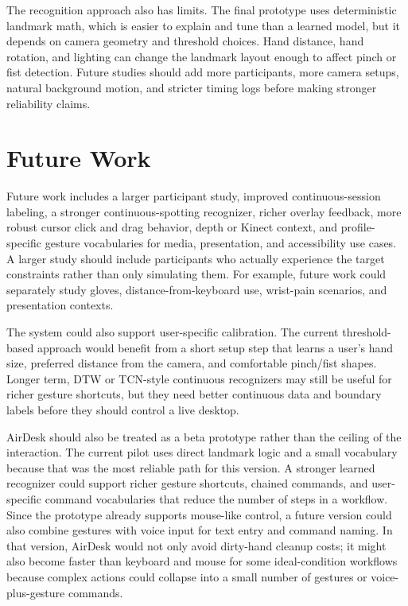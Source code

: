 \documentclass[manuscript]{acmart}
\begin{document}
The recognition approach also has limits. The final prototype uses deterministic landmark math, which is easier to explain and tune than a learned model, but it depends on camera geometry and threshold choices. Hand distance, hand rotation, and lighting can change the landmark layout enough to affect pinch or fist detection. Future studies should add more participants, more camera setups, natural background motion, and stricter timing logs before making stronger reliability claims.

\section{Future Work}

Future work includes a larger participant study, improved continuous-session labeling, a stronger continuous-spotting recognizer, richer overlay feedback, more robust cursor click and drag behavior, depth or Kinect context, and profile-specific gesture vocabularies for media, presentation, and accessibility use cases. A larger study should include participants who actually experience the target constraints rather than only simulating them. For example, future work could separately study gloves, distance-from-keyboard use, wrist-pain scenarios, and presentation contexts.

The system could also support user-specific calibration. The current threshold-based approach would benefit from a short setup step that learns a user's hand size, preferred distance from the camera, and comfortable pinch/fist shapes. Longer term, DTW or TCN-style continuous recognizers may still be useful for richer gesture shortcuts, but they need better continuous data and boundary labels before they should control a live desktop.

AirDesk should also be treated as a beta prototype rather than the ceiling of the interaction. The current pilot uses direct landmark logic and a small vocabulary because that was the most reliable path for this version. A stronger learned recognizer could support richer gesture shortcuts, chained commands, and user-specific command vocabularies that reduce the number of steps in a workflow. Since the prototype already supports mouse-like control, a future version could also combine gestures with voice input for text entry and command naming. In that version, AirDesk would not only avoid dirty-hand cleanup costs; it might also become faster than keyboard and mouse for some ideal-condition workflows because complex actions could collapse into a small number of gestures or voice-plus-gesture commands.
\end{document}
